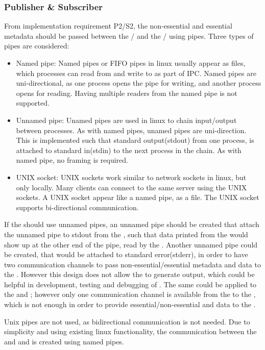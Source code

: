 \subsubsection{Publisher \& Subscriber}
From implementation requirement P2/S2, the non-essential and essential metadata should be passed between the \pub{}/\sub{} and the \con{}/\pro{} using pipes. Three types of pipes are considered:
\begin{itemize}
	\item Named pipe: Named pipes or FIFO pipes in linux usually appear as files, which processes can read from and write to as part of \ac{IPC}. Named pipes are uni-directional, as one process opens the pipe for writing, and another process opens for reading. Having multiple readers from the named pipe is not supported.
	
	\item Unnamed pipe: Unamed pipes are used in linux to chain input/output between processes. As with named pipes, unamed pipes are uni-direction. This is implemented such that standard output(stdout) from one process, is attached to standard in(stdin) to the next process in the chain. As with named pipe, no framing is required.
	
	\item UNIX socket: UNIX sockets work similar to network sockets in linux, but only locally. Many clients can connect to the same server using the UNIX sockets. A UNIX socket appear like a named pipe, as a file. The UNIX socket supports bi-directional communication. 
\end{itemize}

If the \pub{} should use unnamed pipes, an unnamed pipe should be created that attach the unnamed pipe to stdout from the \pro{}, such that data printed from the \pro{} would show up at the other end of the pipe, read by the \pub{}. Another unnamed pipe could be created, that would be attached to standard error(stderr), in order to have two communication channels to pass non-essential/essential metadata and data to the \pub{}. However this design does not allow the \pro{} to generate output, which could be helpful in development, testing and debugging of \cons{}. The same could be applied to the \sub{} and \con{}; however only one communication channel is available from the \sub{} to the \con{}, which is not enough in order to provide essential/non-essential and data to the \con{}.

Unix pipes are not used, as bidirectional communication is not needed. Due to simplicity and using existing linux functionality, the communication between the \pubs{} \subs{} and \con{} and \pro{} is created using named pipes.


